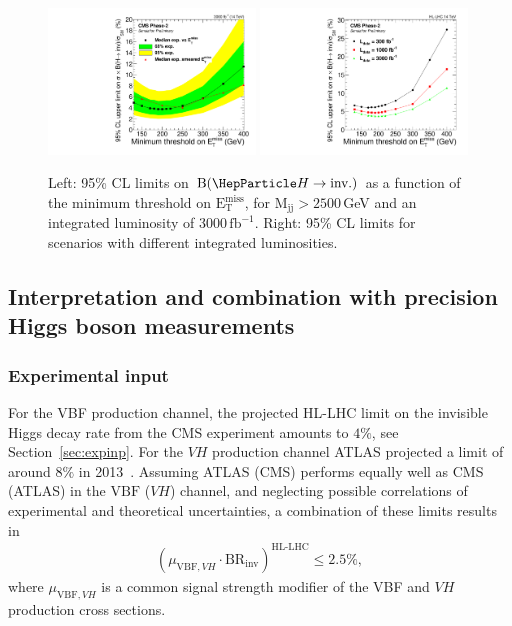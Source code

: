 \documentclass[../report.tex]{subfiles}
\newcommand{\BRHinv}{\mathrm{BR}_\mathrm{inv}}
\newcommand{\MET}{\ensuremath{\mathrm{E}_{\mathrm{T}}^{\mathrm{miss}}}}
\newcommand{\BHinv}{\ensuremath{\text{B}(\PH\to \text{inv.})}\xspace}
\newcommand{\fbinv}{\ensuremath{\,\text{fb}^{-1}\xspace}}
\begin{document}
\begin{figure}[htbp]
  \centering
    \includegraphics[width=0.49\textwidth]{1DlimitMET_forPAS_noMHT}
    \hfill
    \includegraphics[width=0.49\textwidth]{1DlimitvsMET_mcScenario4}
\caption{Left: 95\% CL limits on \BHinv as a function of the minimum threshold on \MET, for M$_{\text{jj}}>2500$\,GeV and an integrated luminosity of 3000\fbinv. Right: 95\% CL limits for scenarios with different integrated luminosities.}
  \label{fig:1Dlimits}
\end{figure}


\subsection{Interpretation and combination with precision Higgs boson measurements}
\subsubsection{Experimental input}
\label{sec6:exp}
{For the VBF production channel, the projected HL-LHC limit on the invisible Higgs decay rate from the CMS experiment amounts to $4\%$, see Section~\ref{sec:expinp}. For the $VH$ production channel ATLAS projected a limit of around $8\%$ in 2013}~\cite{ATL-PHYS-PUB-2013-014}.
Assuming ATLAS (CMS) performs equally well as CMS (ATLAS) in the $\text{VBF}$ ($VH$) channel, {and neglecting possible correlations of experimental and theoretical uncertainties, a combination of these limits results in}
\begin{align}\label{eq:brinvcombi}
\left(\mu_{\text{VBF},VH} \cdot \BRHinv \right)^\text{HL-LHC} \le 2.5\%,
\end{align}
where $\mu_{\text{VBF},VH}$ is a common signal strength modifier of the VBF and $VH$ production cross sections.
\end{document}

